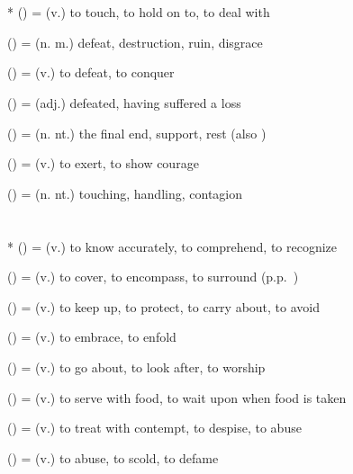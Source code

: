 \section*{}\label{upasagga:paraa}
\begin{compactitem}
\item {}* () = (v.) to touch, to hold on to, to deal with
\item {} () = (n. m.) defeat, destruction, ruin, disgrace
\item {} () = (v.) to defeat, to conquer
\item {} () = (adj.) defeated, having suffered a loss
\item {} () = (n. nt.) the final end, support, rest (also )
\item {} () = (v.) to exert, to show courage
\item {} () = (n. nt.) touching, handling, contagion
\end{compactitem}

\section*{}\label{upasagga:pari}
\begin{compactitem}
\item {}* () = (v.) to know accurately, to comprehend, to recognize
\item {} () = (v.) to cover, to encompass, to surround (p.p.\ )
\item {} () = (v.) to keep up, to protect, to carry about, to avoid
\item {} () = (v.) to embrace, to enfold
\item {} () = (v.) to go about, to look after, to worship
\item {} () = (v.) to serve with food, to wait upon when food is taken
\item {} () = (v.) to treat with contempt, to despise, to abuse
\item {} () = (v.) to abuse, to scold, to defame
\end{compactitem}

